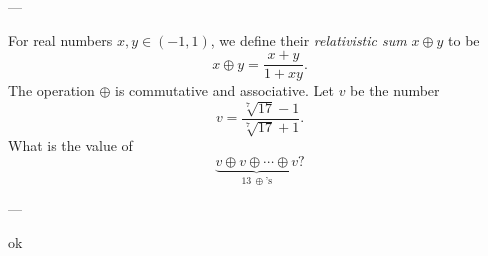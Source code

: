 
---

For real numbers $x,y\in(-1,1)$, we define their \emph{relativistic sum} $x\oplus y$ to be \[x\oplus y=\frac{x+y}{1+xy}.\]
The operation $\oplus$ is commutative and associative. Let $v$ be the number \[v=\frac{\sqrt[7]{17}-1}{\sqrt[7]{17}+1}.\]
What is the value of \[\underbrace{v\oplus v\oplus\cdots\oplus v}_{13\ \oplus\text{'s}}?\]

---

ok
